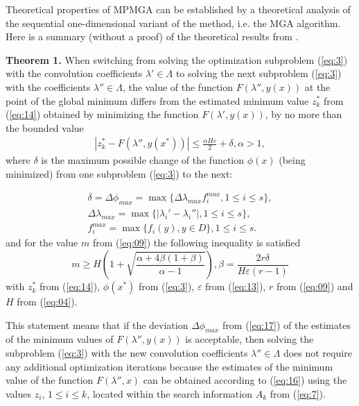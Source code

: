 Theoretical properties of MPMGA can be established by a theoretical analysis of the sequential one-dimensional variant of the method, i.e. the MGA algorithm. Here is a summary (without a proof) of the theoretical results from \cite{c16}.

\textbf{Theorem 1.} When switching from solving the optimization subproblem (\ref{eq:3}) with the convolution coefficients $\lambda' \in \Lambda$ to solving the next subproblem (\ref{eq:3}) with the coefficients $\lambda'' \in \Lambda$, the value of the function $F(\lambda'',y(x))$ at the point of the global minimum differs from the estimated minimum value $z_k^*$ from (\ref{eq:14}) obtained by minimizing the function $F(\lambda',y(x))$, by no more than the bounded value 
\begin{eqnarray} \label{eq:16}
|z_k^*-F(\lambda'',y(x^*))| \leq \frac{\alpha H \varepsilon}{2} + \delta, \alpha>1,
\end{eqnarray} 
where $\delta$ is the maximum possible change of the function $\phi(x)$ (being minimized) from one subproblem (\ref{eq:3}) to the next:

\begin{equation} \label{eq:17}
\begin{split}
\delta=\Delta \phi_{max}=\max{\{\Delta \lambda_{max} f_i^{max}, 1 \leq i \leq s \}},\\
\Delta \lambda_{max}=\max{\{|\lambda_i'-\lambda_i'' |, 1 \leq i \leq s\}},	\\
f_i^{max} = \max {\{f_i (y), y \in D\} }, 1 \leq i \leq s.
\end{split}
\end{equation} 
and for the value $m$ from (\ref{eq:09}) the following inequality is satisfied
\begin{equation*}
m \geq H\left(1+\sqrt{\frac{\alpha+4\beta(1+\beta)}{\alpha-1}} \right), \beta = \frac{2r\delta}{H\varepsilon(r-1)}
\end{equation*} 
with $z_k^*$ from (\ref{eq:14}), $\phi(x^*)$ from (\ref{eq:3}), $\varepsilon$ from (\ref{eq:13}), $r$ from (\ref{eq:09}) and $H$ from (\ref{eq:04}).

This statement means that if the deviation $\Delta \phi_{max}$ from (\ref{eq:17}) of the estimates of the minimum values of $F(\lambda'',y(x))$ is acceptable, then solving the subproblem (\ref{eq:3}) with the new convolution coefficients $\lambda'' \in \Lambda$ does not require any additional optimization iterations because the estimates of the minimum value of the function $F(\lambda'',x)$ can be obtained according to (\ref{eq:16}) using the values $z_i$, $1 \leq i \leq k$, located within the search information $A_k$ from (\ref{eq:7}).

